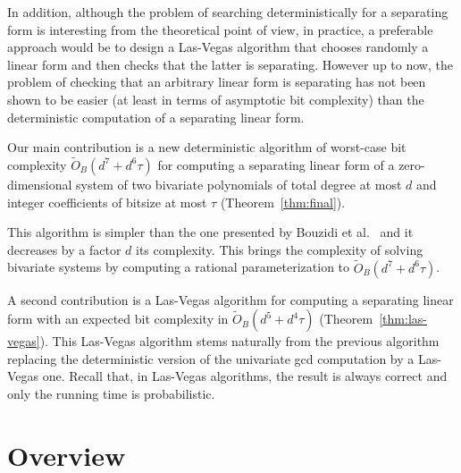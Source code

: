 \documentclass{sig-alternate}
\newcommand{\sOB}{\ensuremath{\widetilde{{O}}_B}}
\newcommand{\blue}[1]{\color{blue}#1\color{black}\xspace}
\renewcommand{\blue}[1]{#1\xspace}
\begin{document}
In addition, although the problem of searching deterministically for a separating form is interesting from the theoretical point of view, in practice, a preferable approach would be to design a Las-Vegas algorithm that chooses randomly  a linear form and then checks that the latter is separating. However up to now, the problem of checking that an arbitrary linear form is separating has not been shown to be easier (at least in terms of asymptotic bit complexity) than the deterministic computation of a separating linear form.


\smallskip

\quad
Our main contribution is a new deterministic algorithm of worst-case bit
complexity $\sOB(d^7+d^6\tau)$ for computing a separating linear form of a zero-dimensional system of two
bivariate polynomials of total degree at most $d$ and integer coefficients of
bitsize at most $\tau$ (Theorem~\ref{thm:final}). 

This algorithm is simpler than the one presented by Bouzidi et al.~\blue{\cite{bouzidiJSC2014a}} 
and it
decreases by a factor $d$ its complexity. This 
brings the complexity of solving bivariate systems by computing a rational parameterization to $\sOB(d^7+d^6\tau)$. 

A second contribution is a Las-Vegas algorithm for computing a separating linear form with an expected bit complexity in $\sOB(d^5+d^4\tau)$ (Theorem~\ref{thm:las-vegas}). This Las-Vegas algorithm stems naturally from the previous algorithm replacing the deterministic version of the univariate gcd computation by a Las-Vegas one.
Recall that, \blue{in Las-Vegas algorithms, the result is always correct and only the running time is probabilistic.}


 \section{Overview}
 \label{sec:overview}
\end{document}
